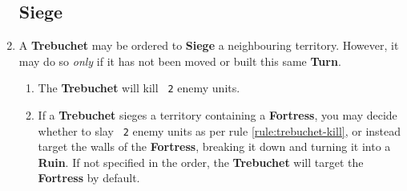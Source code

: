 \documentclass[10pt,openright,a4paper,openany]{article}
\newcommand{\num}[1]{\texttt{\color{purple} {#1}}}
\newcommand{\term}[1]{\textbf{\color{purple} #1}}
\newcommand{\fortress}{\term{Fortress}}
\begin{document}
\begin{enumerate}
	\subsection*{Siege}
	\item A \term{Trebuchet} may be ordered to \term{Siege} a neighbouring territory. However, it may do so \emph{only} if it has not been moved or built this same \term{Turn}.
	\begin{enumerate}
		\item \label{rule:trebuchet-kill}The \term{Trebuchet} will kill \num{2} enemy units.
	\item If a \term{Trebuchet} sieges a territory containing a \term{Fortress}, you may decide whether to slay \num{2} enemy units as per rule \ref{rule:trebuchet-kill}, or instead target the walls of the \term{Fortress}, breaking it down and turning it into a \term{Ruin}. If not specified in the order, the \term{Trebuchet} will target the \term{Fortress} by default.
	\end{enumerate}


\end{enumerate}
\end{document}
